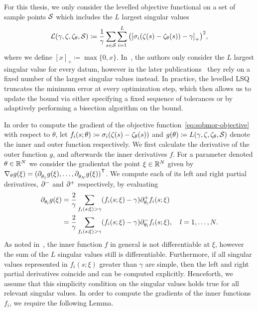 For this thesis, we only consider the levelled objective functional on a set of sample points $\mcl{S}$ which includes the $L$ largest singular values
\begin{equation}\label{eq:sobmor-objective}
    \mcl{L}(\gamma, \tfunc, \tfunc_\theta, \mcl{S}) \coloneqq \frac{1}{\gamma} \sum\limits_{s \in \mcl{S}} \sum\limits_{i = 1}^L {\left( {[\sigma_i(\tfunc(s) - \tfunc_\theta(s)) - \gamma]}_+ \right)}^2,
\end{equation}
where we define ${[x]}_+ \coloneqq \max \{ 0, x \}$.
In~\cite{Schwerdtner2021, SV2021}, the authors only consider the $L$ largest singular value for every datum, however in the later publications~\cite{Schwerdtner2023, SV2023} they rely on a fixed number of the largest singular values instead.
In practice, the levelled \ac{LSQ} truncates the minimum error at every optimization step, which then allows us to update the bound via either specifying a fixed sequence of tolerances or by adaptively performing a bisection algorithm on the bound.

In order to compute the gradient of the objective function~\eqref{eq:sobmor-objective} with respect to $\theta$, let $f_i(s; \theta) \coloneqq \sigma_i(\tfunc(s) - \tfunc_\theta(s))$ and $g(\theta) \coloneqq L(\gamma, \tfunc, \tfunc_\theta, \mcl{S})$ denote the inner and outer function respectively.
We first calculate the derivative of the outer function $g$, and afterwards the inner derivatives $f$.
For a parameter denoted $\theta \in \bb{R}^N$ we consider the gradientat the point $\xi \in \bb{R}^N$ given by $\nabla_\theta g(\xi) = {(\pd[\theta_1]{} g(\xi), \dots, \pd[\theta_N]{} g(\xi))}\trans$.
We compute each of its left and right partial derivatives, $\pd[]{-}$ and $\pd[]{+}$ respectively, by evaluating
\begin{equation}\label{eq:outer-sobmor-objective-gradient}
    \begin{alignedat}{1}
        \pd[\theta_l]{} g(\xi) &= \frac{2}{\gamma} \sum\limits_{f_i(s; \xi) > \gamma} (f_i(s; \xi) - \gamma) \pd[\theta_l]{+} f_i(s; \xi) \\
        &= \frac{2}{\gamma} \sum\limits_{f_i(s; \xi) > \gamma} (f_i(s; \xi) - \gamma) \pd[\theta_l]{-} f_i(s; \xi),\quad l = 1, \dots, N.
    \end{alignedat}
\end{equation}
As noted in~\cite[Remark~3.8]{SV2023}, the inner function $f$ in general is not differentiable at $\xi$, however the sum of the $L$ singular values still is differentiable.
Furthermore, if all singular values represented in $f_i(s; \xi)$ greater than $\gamma$ are simple, then the left and right partial derivatives coincide and can be computed explicitly.
Henceforth, we assume that this simplicity condition on the singular values holds true for all relevant singular values.
In order to compute the gradients of the inner functions $f_i$, we require the following Lemma.

